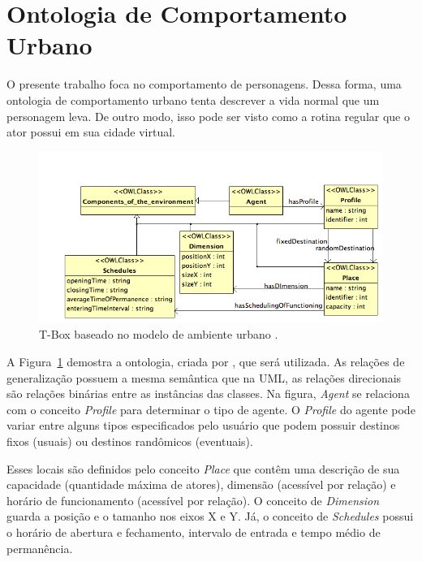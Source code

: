 \section{Ontologia de Comportamento Urbano} \label{ch:aec:ocu}

O presente trabalho foca no comportamento de personagens. Dessa forma, uma
ontologia de comportamento urbano tenta descrever a vida normal que um
personagem leva. De outro modo, isso pode ser visto como a rotina regular que
o ator possui em sua cidade virtual.

\begin{figure}[t]
  \centering
    \includegraphics[width=150mm]{figuras/uem-tbox.png}
  \caption{T-Box baseado no modelo de ambiente urbano \cite{paiva2005ontology}.}
  \label{fig:UEM:TBOX}
\end{figure}

A Figura~\ref{fig:UEM:TBOX} demostra a ontologia, criada por
\citet{paiva2005ontology}, que será utilizada. As relações de generalização
possuem a mesma semântica que na UML, as relações direcionais são relações
binárias entre as instâncias das classes. Na figura, \emph{Agent} se relaciona
com o conceito \emph{Profile} para determinar o tipo de agente. O
\emph{Profile} do agente pode variar entre alguns tipos especificados pelo
usuário que podem possuir destinos fixos (usuais) ou destinos randômicos
(eventuais).

Esses locais são definidos pelo conceito \emph{Place} que contêm
uma descrição de sua capacidade (quantidade máxima de atores), dimensão
(acessível por relação) e horário de funcionamento (acessível por relação). O
conceito de \emph{Dimension} guarda a posição e o tamanho nos eixos X e Y. Já,
o conceito de \emph{Schedules} possui o horário de abertura e fechamento,
intervalo de entrada e tempo médio de permanência.

